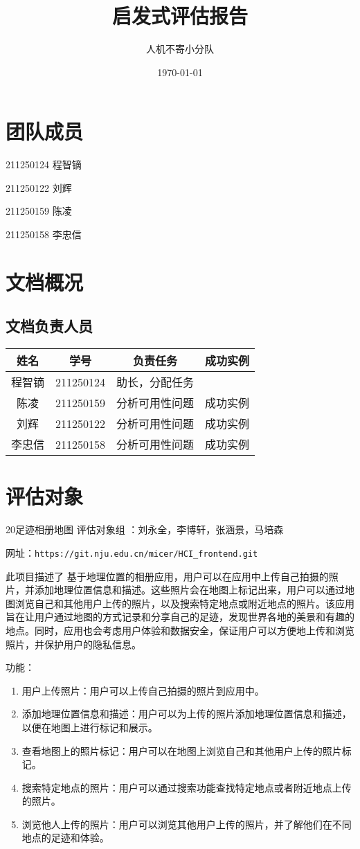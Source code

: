 \documentclass[a4paper,12pt]{article}
\title{启发式评估报告}
\author{人机不寄小分队}
\date{\today}
\begin{document}
\maketitle

\tableofcontents

\section{团队成员}
211250124 程智镝

211250122 刘辉

211250159 陈凌

211250158 李忠信

\section{文档概况}
\subsection{文档负责人员}
\begin{tabular}{|c|c|c|c|}
    \hline
    姓名   & 学号     & 负责任务               & 成功实例   \\
    \hline
    程智镝 & 211250124& 助长，分配任务         &            \\
    陈凌 & 211250159& 分析可用性问题         & 成功实例   \\
    刘辉 & 211250122& 分析可用性问题         & 成功实例   \\
    李忠信 & 211250158& 分析可用性问题         & 成功实例   \\
    \hline
\end{tabular}

\section{评估对象}
20足迹相册地图    
评估对象组 ：刘永全，李博轩，张涵景，马培森

网址：\verb|https://git.nju.edu.cn/micer/HCI_frontend.git|

此项目描述了 基于地理位置的相册应用，用户可以在应用中上传自己拍摄的照片，并添加地理位置信息和描述。这些照片会在地图上标记出来，用户可以通过地图浏览自己和其他用户上传的照片，以及搜索特定地点或附近地点的照片。该应用旨在让用户通过地图的方式记录和分享自己的足迹，发现世界各地的美景和有趣的地点。同时，应用也会考虑用户体验和数据安全，保证用户可以方便地上传和浏览照片，并保护用户的隐私信息。

功能：
\begin{enumerate}
    \item 用户上传照片：用户可以上传自己拍摄的照片到应用中。
    \item 添加地理位置信息和描述：用户可以为上传的照片添加地理位置信息和描述，以便在地图上进行标记和展示。
    \item 查看地图上的照片标记：用户可以在地图上浏览自己和其他用户上传的照片标记。
    \item 搜索特定地点的照片：用户可以通过搜索功能查找特定地点或者附近地点上传的照片。
    \item 浏览他人上传的照片：用户可以浏览其他用户上传的照片，并了解他们在不同地点的足迹和体验。
\end{enumerate}
\end{document}
